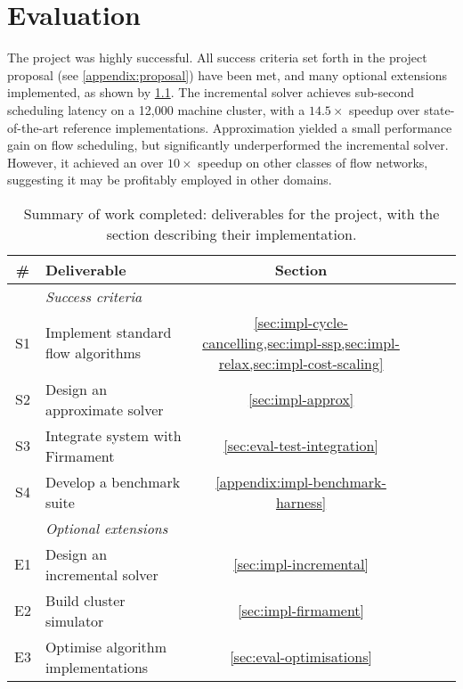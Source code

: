 \chapter{Evaluation} \label{chap:eval}

The project was highly successful. All success criteria set forth in the project proposal (see \cref{appendix:proposal}) have been met, and many optional extensions implemented, as shown by \cref{table:eval-project-requirements}. The incremental solver achieves sub-second scheduling latency on a 12,000 machine cluster, with a $14.5\times$ speedup over state-of-the-art reference implementations. Approximation yielded a small performance gain on flow scheduling, but significantly underperformed the incremental solver. However, it achieved an over $10\times$ speedup on other classes of flow networks, suggesting it may be profitably employed in other domains.

\begin{table}
    \centering
    \begin{tabular}{clcccc}
        \textbf{\#} & \textbf{Deliverable} & \textbf{Section}
        \tabularnewline
        \hline
        & \textit{Success criteria} \tabularnewline
        S1 & Implement standard flow algorithms & \cref{sec:impl-cycle-cancelling,sec:impl-ssp,sec:impl-relax,sec:impl-cost-scaling} \tabularnewline
        S2 & Design an approximate solver & \cref{sec:impl-approx} \tabularnewline
        S3 & Integrate system with Firmament & \cref{sec:eval-test-integration} \tabularnewline
        S4 & Develop a benchmark suite & \cref{appendix:impl-benchmark-harness} \tabularnewline
        \hline
        & \textit{Optional extensions} \tabularnewline
        E1 & Design an incremental solver & \cref{sec:impl-incremental} \tabularnewline
        E2 & Build cluster simulator & \cref{sec:impl-firmament} \tabularnewline
        E3 & Optimise algorithm implementations & \cref{sec:eval-optimisations} \tabularnewline
        \hline
    \end{tabular}
    \crefsections
    \caption[Summary of work completed]{Summary of work completed: deliverables for the project, with the section describing their implementation.}
    \label{table:eval-project-requirements}
\end{table}

